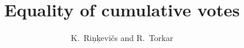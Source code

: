 
\title{Equality of cumulative votes}

\author{K.~Ri{\c n}{\c k}evi{\v c}s and R.~Torkar\corrauth}

\address{Blekinge Institute of Technology, 371 79 Karlskrona, Sweden}


\begin{abstract}

\end{abstract}


\maketitle
